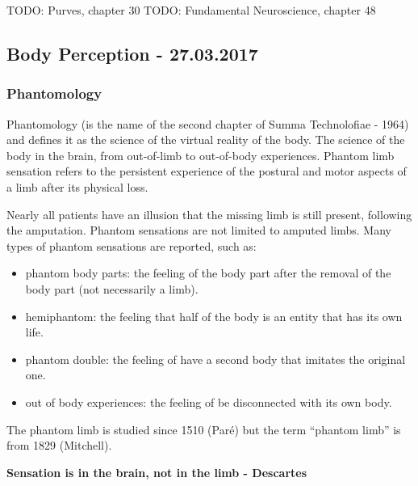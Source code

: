 \documentclass[12pt,article,oneside,a4paper]{memoir}
\begin{document}
TODO: Purves, chapter 30
TODO: Fundamental Neuroscience, chapter 48

\newpage
\subsection{Body Perception - 27.03.2017}
\subsubsection{Phantomology}
Phantomology (is the name of the second chapter of Summa Technolofiae - 1964) and defines it as the science of the virtual reality of the body.
The science of the body in the brain, from out-of-limb to out-of-body experiences. 
Phantom  limb  sensation refers to the persistent experience of the postural and motor aspects of a limb after its physical loss.

Nearly all patients have an illusion that the missing limb is still present, following the amputation.
Phantom sensations are not limited to amputed limbs. Many types of phantom sensations are reported, such as:
\begin{itemize}
\item phantom body parts: the feeling of the body part after the removal of the body part (not necessarily a limb).
\item hemiphantom: the feeling that half of the body is an entity that has its own life.
\item phantom double: the feeling of have a second body that imitates the original one.
\item out of body experiences: the feeling of be disconnected with its own body.
\end{itemize}

The phantom limb is studied since 1510 (Paré) but the term ``phantom limb'' is from 1829 (Mitchell).

\textbf{Sensation is in the brain, not in the limb - Descartes}
\end{document}
